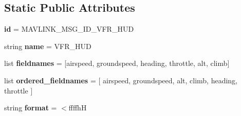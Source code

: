 \subsection*{Static Public Attributes}
\begin{DoxyCompactItemize}
\item 
\mbox{\label{classpymavlink_1_1dialects_1_1v10_1_1MAVLink__vfr__hud__message_a41ea1c909ce06fcb13a1c01d9d36466b}} 
{\bfseries id} = M\+A\+V\+L\+I\+N\+K\+\_\+\+M\+S\+G\+\_\+\+I\+D\+\_\+\+V\+F\+R\+\_\+\+H\+UD
\item 
\mbox{\label{classpymavlink_1_1dialects_1_1v10_1_1MAVLink__vfr__hud__message_adc4dc1faacd513c4e55442fd7748ab94}} 
string {\bfseries name} = \textquotesingle{}V\+F\+R\+\_\+\+H\+UD\textquotesingle{}
\item 
\mbox{\label{classpymavlink_1_1dialects_1_1v10_1_1MAVLink__vfr__hud__message_a050f7ee7271c70ed68c9772cc5e4600b}} 
list {\bfseries fieldnames} = \mbox{[}\textquotesingle{}airspeed\textquotesingle{}, \textquotesingle{}groundspeed\textquotesingle{}, \textquotesingle{}heading\textquotesingle{}, \textquotesingle{}throttle\textquotesingle{}, \textquotesingle{}alt\textquotesingle{}, \textquotesingle{}climb\textquotesingle{}\mbox{]}
\item 
\mbox{\label{classpymavlink_1_1dialects_1_1v10_1_1MAVLink__vfr__hud__message_aadf1ea766581bb9251aad6ae7e499dbc}} 
list {\bfseries ordered\+\_\+fieldnames} = \mbox{[} \textquotesingle{}airspeed\textquotesingle{}, \textquotesingle{}groundspeed\textquotesingle{}, \textquotesingle{}alt\textquotesingle{}, \textquotesingle{}climb\textquotesingle{}, \textquotesingle{}heading\textquotesingle{}, \textquotesingle{}throttle\textquotesingle{} \mbox{]}
\item 
\mbox{\label{classpymavlink_1_1dialects_1_1v10_1_1MAVLink__vfr__hud__message_a1badd1f9a521becf6afe0cd9b4640c32}} 
string {\bfseries format} = \textquotesingle{}$<$ffffhH\textquotesingle{}
\item 
\mbox{\label{classpymavlink_1_1dialects_1_1v10_1_1MAVLink__vfr__hud__message_a6f7f49a8f6bfc195818ecb0501840e09}} 

\end{DoxyCompactItemize}
